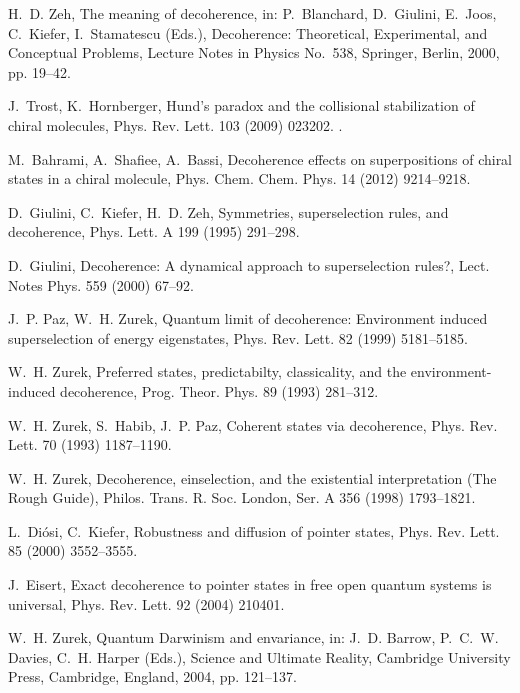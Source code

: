 \documentclass[3p,sort&compress]{elsarticle}
\begin{document}
\begin{thebibliography}{100}
H.~D. Zeh, The meaning of decoherence, in: P.~Blanchard, D.~Giulini, E.~Joos,
  C.~Kiefer, I.~Stamatescu (Eds.), Decoherence: {T}heoretical, Experimental,
  and Conceptual Problems, Lecture Notes in Physics {No.\ 538}, Springer,
  Berlin, 2000, pp. 19--42.

J.~Trost, K.~Hornberger, Hund's paradox and the collisional stabilization of
  chiral molecules, Phys. Rev. Lett. 103 (2009) 023202.
\newblock \href {http://dx.doi.org/10.1103/PhysRevLett.103.023202}
  {}.

M.~Bahrami, A.~Shafiee, A.~Bassi, Decoherence effects on superpositions of
  chiral states in a chiral molecule, Phys. Chem. Chem. Phys. 14 (2012)
  9214--9218.

D.~Giulini, C.~Kiefer, H.~D. Zeh, Symmetries, superselection rules, and
  decoherence, Phys. Lett. A 199 (1995) 291--298.

D.~Giulini, Decoherence: A dynamical approach to superselection rules?, Lect.
  Notes Phys. 559 (2000) 67--92.

J.~P. Paz, W.~H. Zurek, Quantum limit of decoherence: Environment induced
  superselection of energy eigenstates, Phys. Rev. Lett. 82 (1999) 5181--5185.

W.~H. Zurek, Preferred states, predictabilty, classicality, and the
  environment-induced decoherence, Prog. Theor. Phys. 89 (1993) 281--312.

W.~H. Zurek, S.~Habib, J.~P. Paz, Coherent states via decoherence, Phys. Rev.
  Lett. 70 (1993) 1187--1190.

W.~H. Zurek, Decoherence, einselection, and the existential interpretation
  ({T}he {R}ough {G}uide), Philos. Trans. R. Soc. London, Ser. A 356 (1998)
  1793--1821.

L.~Di{\'o}si, C.~Kiefer, Robustness and diffusion of pointer states, Phys. Rev.
  Lett. 85 (2000) 3552--3555.

J.~Eisert, Exact decoherence to pointer states in free open quantum systems is
  universal, Phys. Rev. Lett. 92 (2004) 210401.

W.~H. Zurek, Quantum {D}arwinism and envariance, in: J.~D. Barrow, P.~C.~W.
  Davies, C.~H. Harper (Eds.), Science and Ultimate Reality, Cambridge
  University Press, Cambridge, England, 2004, pp. 121--137.


\end{thebibliography}
\end{document}
